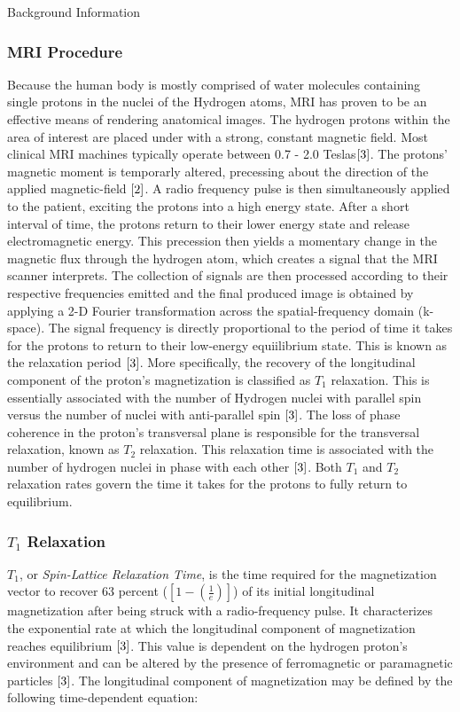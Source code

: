 \documentclass[a4paper,12pt]{article}
\begin{document}
\begin{section}{Background Information}
\subsubsection{MRI Procedure}
Because the human body is mostly comprised of water molecules containing single protons in the nuclei of the Hydrogen atoms, MRI has proven to be an effective means of rendering anatomical images. The hydrogen protons within the area of interest are placed under with a strong, constant magnetic field.
Most clinical MRI machines typically operate between 0.7 - 2.0 Teslas$\cite{3}$. 
The protons' magnetic moment is temporarly altered, precessing about the direction of the applied magnetic-field $\cite{2}$. 
A radio frequency pulse is then simultaneously applied to the patient, exciting the protons into a high energy state. After a short interval of time, the protons return to their lower energy state and release electromagnetic energy.
This precession then yields a momentary change in the magnetic flux through the hydrogen atom, which creates a signal that the MRI scanner interprets. The collection of signals are then processed according to their respective frequencies emitted and the final produced image is obtained by applying a 2-D Fourier transformation across the spatial-frequency domain (k-space). 
The signal frequency is directly proportional to the period of time it takes for the protons to return to their low-energy equiilibrium state. This is known as the relaxation period $\cite{3}$. 
More specifically, the recovery of the longitudinal component of the proton's magnetization is classified as $T_1$ relaxation. This is essentially associated with the number of Hydrogen nuclei with parallel spin versus the number of nuclei with anti-parallel spin $\cite{3}$. 
The loss of phase coherence in the proton's transversal plane is responsible for the transversal relaxation, known as $T_2$ relaxation. This relaxation time is associated with the number of hydrogen nuclei in phase with each other $\cite{3}$. 
Both $T_1$ and $T_2$ relaxation rates govern the time it takes for the protons to fully return to equilibrium.


\newpage
\subsubsection{$T_1$ Relaxation}
$T_1$, or {\em Spin-Lattice Relaxation Time}, is the time required for the magnetization vector to recover 63 percent ($[1-(\frac{1}{e})]$) of its initial longitudinal magnetization after being struck with a radio-frequency pulse. It characterizes the exponential rate at which the longitudinal component of magnetization reaches equilibrium $\cite{3}$. This value is dependent on the hydrogen proton's environment and can be altered by the presence of ferromagnetic or paramagnetic particles $\cite{3}$. The longitudinal component of magnetization may be defined by the following time-dependent equation:


\end{section}
\end{document}
